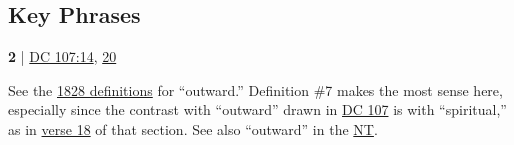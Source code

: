 \subsection{Key Phrases} %
	\label{ORDINANCE-PHRASES}

	\begin{compactdesc}
		\item[outward ordinance] \textbf{2} | \hyperref[DC107-14]{DC 107:14}, \hyperref[DC107-20]{20}
			\begin{compactdesc}
				\item[Commentary] See the \hyperref[OUTWARD-1828]{1828 definitions} for ``outward.'' Definition \#7 makes the most sense here, especially since the contrast with ``outward'' drawn in \hyperref[DC107]{DC 107} is with ``spiritual,'' as in \hyperref[DC107-18]{verse 18} of that section. See also ``outward'' in the \hyperref[OUTWARD-NT]{NT}.
			\end{compactdesc}
	\end{compactdesc}
	


	
		
	
